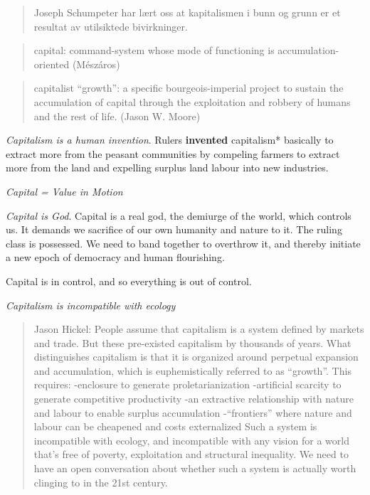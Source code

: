 \documentclass[
]{book}
\begin{document}
\begin{quote}
Joseph Schumpeter har lært oss at kapitalismen i bunn og grunn er et resultat av utilsiktede bivirkninger.
\end{quote}

\begin{quote}
capital: command-system whose mode of functioning is accumulation-oriented (Mészáros)
\end{quote}

\begin{quote}
capitalist ``growth'': a specific bourgeois-imperial project to sustain the accumulation of capital through the exploitation and robbery of humans and the rest of life. (Jason W. Moore)
\end{quote}

\emph{Capitalism is a human invention}.
Rulers \textbf{invented} capitalism* basically to
extract more from the peasant communities by compeling farmers to extract more from the land
and expelling surplus land labour into new industries.

\emph{Capital = Value in Motion}

\emph{Capital is God}.
Capital is a real god, the demiurge of the world, which controls us. It demands we sacrifice of our own humanity and nature to it. The ruling class is possessed. We need to band together to overthrow it, and thereby initiate a new epoch of democracy and human flourishing.

Capital is in control, and so everything is out of control.

\emph{Capitalism is incompatible with ecology}

\begin{quote}
Jason Hickel: People assume that capitalism is a system
defined by markets and trade.
But these pre-existed capitalism by thousands of years.
What distinguishes capitalism is that it is organized around
perpetual expansion and accumulation,
which is euphemistically referred to as ``growth''.
This requires:
-enclosure to generate proletarianization
-artificial scarcity to generate competitive productivity
-an extractive relationship with nature and labour to enable surplus accumulation
-``frontiers'' where nature and labour can be cheapened and costs externalized
Such a system is incompatible with ecology, and incompatible with any vision
for a world that's free of poverty, exploitation and structural inequality.
We need to have an open conversation about whether such a system is actually
worth clinging to in the 21st century.
\end{quote}
\end{document}
